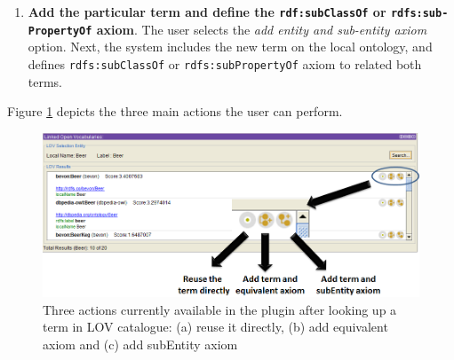 \begin{enumerate}
\vspace{-1mm}\item \textbf{Add the particular term and define the {\tt rdf:subClassOf} or {\tt rdfs:sub-}\\
{\tt PropertyOf} axiom}. The user selects the \emph{add entity and sub-entity axiom} option. Next, the system includes the new term on the local ontology, and defines {\tt rdfs:subClassOf} or {\tt rdfs:subPropertyOf} axiom to related both terms.
\end{enumerate}

Figure \ref{fig:LOVoptions} depicts the three main actions the user can perform. %

\begin{figure}[b!ht]
\center
\includegraphics[scale=0.4]{img/LOVOptions.png}
\caption{Three actions currently available in the plugin after looking up a term in LOV catalogue: (a) reuse it directly, (b) add equivalent axiom and (c) add subEntity axiom}
\label{fig:LOVoptions}
\end{figure}


